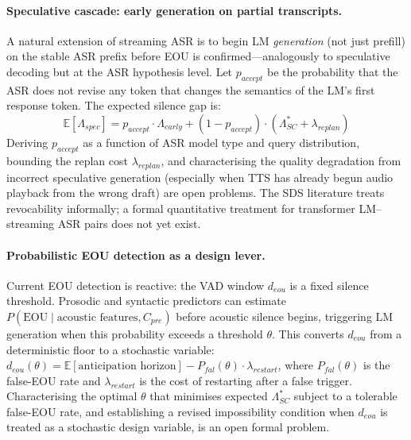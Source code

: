 \paragraph{Speculative cascade: early generation on partial transcripts.}
A natural extension of streaming ASR is to begin LM \emph{generation} (not just prefill)
on the stable ASR prefix before EOU is confirmed---analogously to speculative decoding
\citep{leviathan2023fast} but at the ASR hypothesis level.
Let $p_{accept}$ be the probability that the ASR does not revise any token that changes the
semantics of the LM's first response token.
The expected silence gap is:
\begin{equation}
  \mathbb{E}[\Lambda_{spec}] = p_{accept} \cdot \Lambda_{early}
    + (1 - p_{accept}) \cdot (\Lambda^*_{SC} + \lambda_{replan})
\end{equation}
Deriving $p_{accept}$ as a function of ASR model type and query distribution,
bounding the replan cost $\lambda_{replan}$,
and characterising the quality degradation from incorrect speculative generation
(especially when TTS has already begun audio playback from the wrong draft) are open problems.
The SDS literature \citep{schlangen2011general} treats revocability informally;
a formal quantitative treatment for transformer LM--streaming ASR pairs does not yet exist.

\paragraph{Probabilistic EOU detection as a design lever.}
Current EOU detection is reactive: the VAD window $d_{eou}$ is a fixed silence threshold.
Prosodic and syntactic predictors can estimate $P(\text{EOU} \mid \text{acoustic features},
C_{pre})$ before acoustic silence begins, triggering LM generation when this probability
exceeds a threshold $\theta$.
This converts $d_{eou}$ from a deterministic floor to a stochastic variable:
$d_{eou}(\theta) = \mathbb{E}[\text{anticipation horizon}] - P_{fal}(\theta) \cdot \lambda_{restart}$,
where $P_{fal}(\theta)$ is the false-EOU rate and $\lambda_{restart}$ is the cost of
restarting after a false trigger.
Characterising the optimal $\theta$ that minimises expected $\Lambda^*_{SC}$ subject to
a tolerable false-EOU rate, and establishing a revised impossibility condition when
$d_{eou}$ is treated as a stochastic design variable, is an open formal problem.
